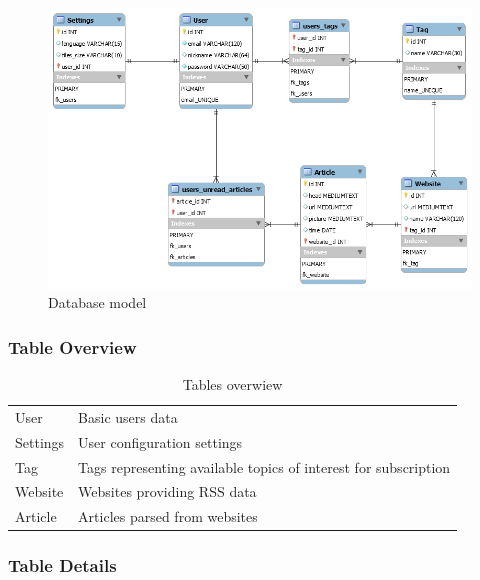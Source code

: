 \documentclass[12pt]{article}
\begin{document}
\begin{figure}[H]
	\includegraphics[width=\textwidth]{images/atomAddictDataBase.png}
	\caption{Database model}
	\label{fig:databaseModel}
\end{figure}

\subsubsection{Table Overview}

\begin{table}[H]
\centering
	\begin{tabular}{p{5cm}p{9cm}}  \hline
	\rowcolor{blue!20!black!30!green}\multicolumn{2}{|c|}{\textbf{AttomAddict Tables Overwiew}} \\ \hline \hline
	User 	  & 		Basic users data						 		\\ \hline
	Settings  & 		User configuration settings 				\\ \hline
	Tag 	  &  		Tags representing available topics of interest for subscription	\\ \hline
	Website   & 		Websites providing RSS data										 \\ \hline
	Article	  & 		Articles parsed from websites 									\\ \hline

	\end{tabular}
	\caption{Tables overwiew}
	\label{tab:tablesOverwiew}
\end{table}

\subsubsection{Table Details}
\end{document}
